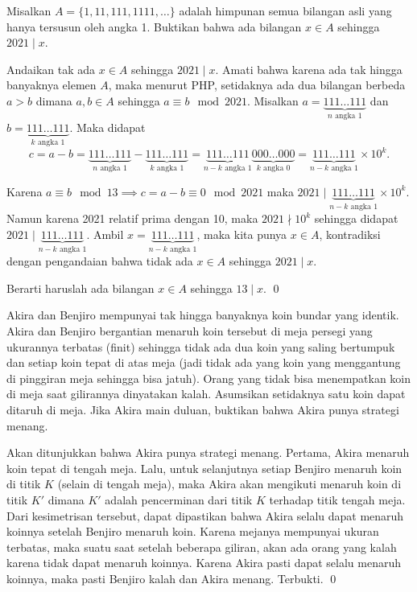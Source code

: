 \documentclass[12pt]{scrartcl}
\begin{document}
	\begin{soalbaru} 
		Misalkan $A = \{1,11,111,1111,\dots\}$ adalah himpunan semua bilangan asli yang hanya tersusun oleh angka 1. Buktikan bahwa ada bilangan $x \in A$ sehingga $2021 \mid x$.\\[-10pt]
		
		\begin{solusi}
		Andaikan tak ada $x \in A$ sehingga $2021 \mid x$. Amati bahwa karena ada tak hingga banyaknya elemen $A$, maka menurut PHP, setidaknya ada dua bilangan berbeda $a>b$ dimana $a,b \in A$ sehingga $a \equiv b \mod 2021$. Misalkan $a = \underbrace{111 \dots 111}_{n \text{ angka } 1}$ dan $b = \underbrace{111 \dots 111}_{k \text{ angka } 1}.$ Maka didapat\\[-20pt] $$c=a-b= \underbrace{111 \dots 111}_{n \text{ angka } 1} - \underbrace{111 \dots 111}_{k \text{ angka } 1}=\underbrace{111 \dots 111}_{n-k \text{ angka } 1}\underbrace{000 \dots 000}_{k \text{ angka } 0}=\underbrace{111 \dots 111}_{n-k \text{ angka } 1} \times 10^k.$$
		
		Karena $a \equiv b \mod 13 \implies c = a -b \equiv 0 \mod 2021$ maka $2021 \mid \underbrace{111 \dots 111}_{n-k \text{ angka } 1} \times 10^k$. Namun karena 2021 relatif prima dengan 10, maka $2021 \nmid 10^k$ sehingga didapat $2021 \mid \underbrace{111 \dots 111}_{n-k \text{ angka } 1}$. Ambil $x = \underbrace{111 \dots 111}_{n-k \text{ angka } 1}$, maka kita punya $x \in A$, kontradiksi dengan pengandaian bahwa tidak ada $x \in A$ sehingga $2021 \mid x$.
		
		Berarti haruslah ada bilangan $x \in A$ sehingga $13 \mid x$. \qed
		\end{solusi}
	\end{soalbaru}
	\newpage
	\begin{soalbaru}
		Akira dan Benjiro mempunyai tak hingga banyaknya koin bundar yang identik. Akira dan Benjiro bergantian menaruh koin tersebut di meja persegi yang ukurannya terbatas (finit) sehingga tidak ada dua koin yang saling bertumpuk dan setiap koin tepat di atas meja (jadi tidak ada yang koin yang menggantung di pinggiran meja sehingga bisa jatuh). Orang yang tidak bisa menempatkan koin di meja saat gilirannya dinyatakan kalah. Asumsikan setidaknya satu koin dapat ditaruh di meja. Jika Akira main duluan, buktikan bahwa Akira punya strategi menang.\\[-10pt]
		
		\begin{solusi}
		Akan ditunjukkan bahwa Akira punya strategi menang. Pertama, Akira menaruh koin tepat di tengah meja. Lalu, untuk selanjutnya setiap Benjiro menaruh koin di titik $K$ (selain di tengah meja), maka Akira akan mengikuti menaruh koin di titik $K'$ dimana $K'$ adalah pencerminan dari titik $K$ terhadap titik tengah meja. Dari kesimetrisan tersebut, dapat dipastikan bahwa Akira selalu dapat menaruh koinnya setelah Benjiro menaruh koin. Karena mejanya mempunyai ukuran terbatas, maka suatu saat setelah beberapa giliran, akan ada orang yang kalah karena tidak dapat menaruh koinnya. Karena Akira pasti dapat selalu menaruh koinnya, maka pasti Benjiro kalah dan Akira menang. Terbukti. \qed
		\end{solusi}
	\end{soalbaru}
	
\end{document}
